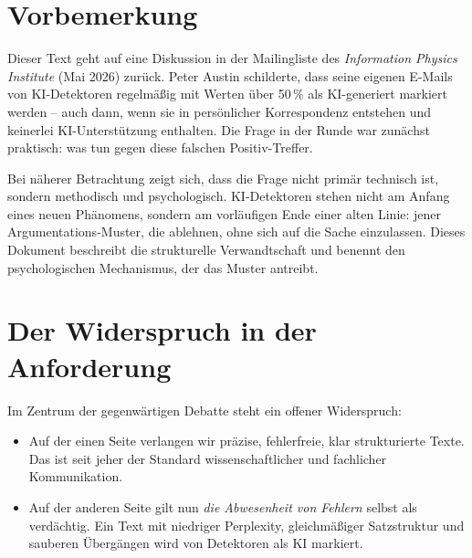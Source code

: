 
\section*{Vorbemerkung}

Dieser Text geht auf eine Diskussion in der Mailingliste des
\emph{Information Physics Institute} (Mai 2026) zurück. Peter Austin
schilderte, dass seine eigenen E-Mails von KI-Detektoren regelmäßig
mit Werten über 50\,\% als KI-generiert markiert werden -- auch
dann, wenn sie in persönlicher Korrespondenz entstehen und keinerlei
KI-Unterstützung enthalten. Die Frage in der Runde war zunächst
praktisch: was tun gegen diese falschen Positiv-Treffer.

Bei näherer Betrachtung zeigt sich, dass die Frage nicht primär
technisch ist, sondern methodisch und psychologisch. KI-Detektoren
stehen nicht am Anfang eines neuen Phänomens, sondern am vorläufigen
Ende einer alten Linie: jener Argumentations-Muster, die ablehnen,
ohne sich auf die Sache einzulassen. Dieses Dokument beschreibt die
strukturelle Verwandtschaft und benennt den psychologischen
Mechanismus, der das Muster antreibt.

\section{Der Widerspruch in der Anforderung}

Im Zentrum der gegenwärtigen Debatte steht ein offener Widerspruch:

\begin{itemize}[leftmargin=2em,itemsep=2pt,topsep=2pt]
  \item Auf der einen Seite verlangen wir präzise, fehlerfreie,
        klar strukturierte Texte. Das ist seit jeher der Standard
        wissenschaftlicher und fachlicher Kommunikation.
  \item Auf der anderen Seite gilt nun \emph{die Abwesenheit von
        Fehlern} selbst als verdächtig. Ein Text mit niedriger
        Perplexity, gleichmäßiger Satzstruktur und sauberen
        Übergängen wird von Detektoren als KI markiert.
\end{itemize}

